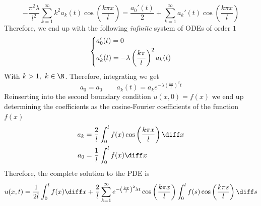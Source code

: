 \documentclass[../mmf.tex]{subfiles}
\begin{document}
\begin{eg}
	\begin{equation*}
		-\frac{\pi^2\lambda}{l^2}\sum_{k=1}^{\infty}k^2a_k(t)\cos\left( \frac{k\pi x}{l} \right)=\frac{a_0'(t)}{2}+\sum_{k=1}^{\infty}a_k'(t)\cos\left( \frac{k\pi x}{l} \right)
	\end{equation*}
	Therefore, we end up with the following \emph{infinite} system of ODEs of order $1$
	\begin{equation*}
		\begin{dcases}
			a_0'(t)=0\\
			a_k'(t)=-\lambda\left( \frac{k\pi}{l} \right)^2a_k(t)
		\end{dcases}
	\end{equation*}
	With $k>1,\ k\in\N$. Therefore, integrating we get
	\begin{equation*}
		a_0=a_0\qquad a_k(t)=a_ke^{-\lambda\left( \frac{k\pi}{l} \right)^2t}
	\end{equation*}
	Reinserting into the second boundary condition $u(x,0)=f(x)$ we end up determining the coefficients as the cosine-Fourier coefficients of the function $f(x)$
	\begin{equation*}
		\begin{aligned}
			a_k&=\frac{2}{l}\int_{0}^{l}f(x)\cos\left( \frac{k\pi x}{l} \right)\diff x\\
			a_0&=\frac{1}{l}\int_{0}^{l}f(x)\diff x
		\end{aligned}
	\end{equation*}
	Therefore, the complete solution to the PDE is
	\begin{equation*}
		u(x,t)=\frac{1}{2l}\int_{0}^{l}f(x)\diff x+\frac{2}{l}\sum_{k=1}^{\infty}e^{-\left( \frac{k\pi}{l} \right)^2\lambda t}\cos\left( \frac{k\pi x}{l} \right)\int_{0}^{l}f(s)\cos\left( \frac{k\pi s}{l} \right)\diff s
	\end{equation*}
\end{eg}
\end{document}

